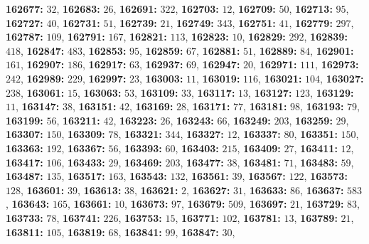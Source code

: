 \textsf{\bfseries 162677:} $32$, \textsf{\bfseries 162683:} $26$, \textsf{\bfseries 162691:} $322$, \textsf{\bfseries 162703:} $12$, \textsf{\bfseries 162709:} $50$, \textsf{\bfseries 162713:} $95$, \textsf{\bfseries 162727:} $40$, \textsf{\bfseries 162731:} $51$, \textsf{\bfseries 162739:} $21$, \textsf{\bfseries 162749:} $343$, \textsf{\bfseries 162751:} $41$, \textsf{\bfseries 162779:} $297$, \textsf{\bfseries 162787:} $109$, \textsf{\bfseries 162791:} $167$, \textsf{\bfseries 162821:} $113$, \textsf{\bfseries 162823:} $10$, \textsf{\bfseries 162829:} $292$, \textsf{\bfseries 162839:} $418$, \textsf{\bfseries 162847:} $483$, \textsf{\bfseries 162853:} $95$, \textsf{\bfseries 162859:} $67$, \textsf{\bfseries 162881:} $51$, \textsf{\bfseries 162889:} $84$, \textsf{\bfseries 162901:} $161$, \textsf{\bfseries 162907:} $186$, \textsf{\bfseries 162917:} $63$, \textsf{\bfseries 162937:} $69$, \textsf{\bfseries 162947:} $20$, \textsf{\bfseries 162971:} $111$, \textsf{\bfseries 162973:} $242$, \textsf{\bfseries 162989:} $229$, \textsf{\bfseries 162997:} $23$, \textsf{\bfseries 163003:} $11$, \textsf{\bfseries 163019:} $116$, \textsf{\bfseries 163021:} $104$, \textsf{\bfseries 163027:} $238$, \textsf{\bfseries 163061:} $15$, \textsf{\bfseries 163063:} $53$, \textsf{\bfseries 163109:} $33$, \textsf{\bfseries 163117:} $13$, \textsf{\bfseries 163127:} $123$, \textsf{\bfseries 163129:} $11$, \textsf{\bfseries 163147:} $38$, \textsf{\bfseries 163151:} $42$, \textsf{\bfseries 163169:} $28$, \textsf{\bfseries 163171:} $77$, \textsf{\bfseries 163181:} $98$, \textsf{\bfseries 163193:} $79$, \textsf{\bfseries 163199:} $56$, \textsf{\bfseries 163211:} $42$, \textsf{\bfseries 163223:} $26$, \textsf{\bfseries 163243:} $66$, \textsf{\bfseries 163249:} $203$, \textsf{\bfseries 163259:} $29$, \textsf{\bfseries 163307:} $150$, \textsf{\bfseries 163309:} $78$, \textsf{\bfseries 163321:} $344$, \textsf{\bfseries 163327:} $12$, \textsf{\bfseries 163337:} $80$, \textsf{\bfseries 163351:} $150$, \textsf{\bfseries 163363:} $192$, \textsf{\bfseries 163367:} $56$, \textsf{\bfseries 163393:} $60$, \textsf{\bfseries 163403:} $215$, \textsf{\bfseries 163409:} $27$, \textsf{\bfseries 163411:} $12$, \textsf{\bfseries 163417:} $106$, \textsf{\bfseries 163433:} $29$, \textsf{\bfseries 163469:} $203$, \textsf{\bfseries 163477:} $38$, \textsf{\bfseries 163481:} $71$, \textsf{\bfseries 163483:} $59$, \textsf{\bfseries 163487:} $135$, \textsf{\bfseries 163517:} $163$, \textsf{\bfseries 163543:} $132$, \textsf{\bfseries 163561:} $39$, \textsf{\bfseries 163567:} $122$, \textsf{\bfseries 163573:} $128$, \textsf{\bfseries 163601:} $39$, \textsf{\bfseries 163613:} $38$, \textsf{\bfseries 163621:} $2$, \textsf{\bfseries 163627:} $31$, \textsf{\bfseries 163633:} $86$, \textsf{\bfseries 163637:} $583$, \textsf{\bfseries 163643:} $165$, \textsf{\bfseries 163661:} $10$, \textsf{\bfseries 163673:} $97$, \textsf{\bfseries 163679:} $509$, \textsf{\bfseries 163697:} $21$, \textsf{\bfseries 163729:} $83$, \textsf{\bfseries 163733:} $78$, \textsf{\bfseries 163741:} $226$, \textsf{\bfseries 163753:} $15$, \textsf{\bfseries 163771:} $102$, \textsf{\bfseries 163781:} $13$, \textsf{\bfseries 163789:} $21$, \textsf{\bfseries 163811:} $105$, \textsf{\bfseries 163819:} $68$, \textsf{\bfseries 163841:} $99$, \textsf{\bfseries 163847:} $30$, 
